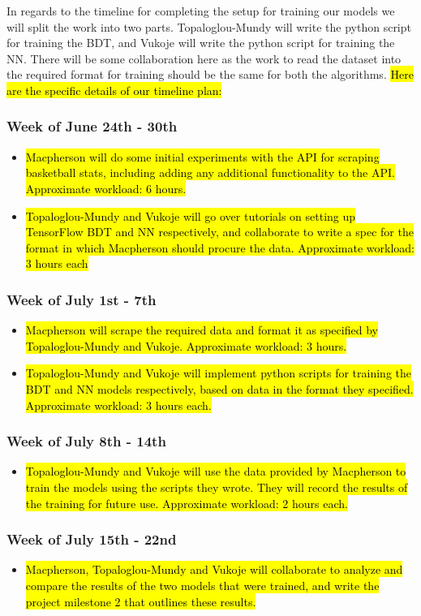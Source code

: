 \documentclass[letterpaper]{article} %
\begin{document}
In regards to the timeline for completing the setup for training our models we will split the work into two parts. Topaloglou-Mundy will write the python script for training the BDT, and Vukoje will write the python script for training the NN. There will be some collaboration here as the work to read the dataset into the required format for training should be the same for both the algorithms. \hl{Here are the specific details of our timeline plan:}
\subsubsection{Week of June 24th - 30th}
\begin{itemize}
\item \hl{Macpherson will do some initial experiments with the API for scraping basketball stats, including adding any additional functionality to the API. Approximate workload: 6 hours.}
\item \hl{Topaloglou-Mundy and Vukoje will go over tutorials on setting up TensorFlow BDT and NN respectively, and collaborate to write a spec for the format in which Macpherson should procure the data. Approximate workload: 3 hours each}
\end{itemize}
\subsubsection{Week of July 1st - 7th}
\begin{itemize}
\item \hl{Macpherson will scrape the required data and format it as specified by Topaloglou-Mundy and Vukoje. Approximate workload: 3 hours.}
\item \hl{Topaloglou-Mundy and Vukoje will implement python scripts for training the BDT and NN models respectively, based on data in the format they specified. Approximate workload: 3 hours each.}
\end{itemize}
\subsubsection{Week of July 8th - 14th}
\begin{itemize}
\item \hl{Topaloglou-Mundy and Vukoje will use the data provided by Macpherson to train the models using the scripts they wrote. They will record the results of the training for future use. Approximate workload: 2 hours each.}
\end{itemize}
\subsubsection{Week of July 15th - 22nd}
\begin{itemize}
\item \hl{Macpherson, Topaloglou-Mundy and Vukoje will collaborate to analyze and compare the results of the two models that were trained, and write the project milestone 2 that outlines these results.}
\end{itemize}
\end{document}
